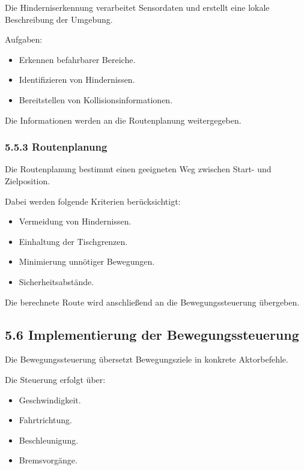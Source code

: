 \documentclass[
  a4paper,
  12pt,
  DIV=12,        %
  parskip=half,  %
  headings=small %
]{scrartcl}
\theoremstyle{definition}
\providecommand{\tightlist}{%
  \setlength{\itemsep}{0pt}\setlength{\parskip}{0pt}}
\theoremstyle{definition}
\providecommand{\tightlist}{%
  \setlength{\itemsep}{0pt}\setlength{\parskip}{0pt}}
\begin{document}
Die Hinderniserkennung verarbeitet Sensordaten und erstellt eine lokale
Beschreibung der Umgebung.

Aufgaben:

\begin{itemize}
\tightlist
\item
  Erkennen befahrbarer Bereiche.
\item
  Identifizieren von Hindernissen.
\item
  Bereitstellen von Kollisionsinformationen.
\end{itemize}

Die Informationen werden an die Routenplanung weitergegeben.

\subsubsection{5.5.3 Routenplanung}\label{routenplanung}

Die Routenplanung bestimmt einen geeigneten Weg zwischen Start- und
Zielposition.

Dabei werden folgende Kriterien berücksichtigt:

\begin{itemize}
\tightlist
\item
  Vermeidung von Hindernissen.
\item
  Einhaltung der Tischgrenzen.
\item
  Minimierung unnötiger Bewegungen.
\item
  Sicherheitsabstände.
\end{itemize}

Die berechnete Route wird anschließend an die Bewegungssteuerung
übergeben.

\subsection{5.6 Implementierung der
Bewegungssteuerung}\label{implementierung-der-bewegungssteuerung}

Die Bewegungssteuerung übersetzt Bewegungsziele in konkrete
Aktorbefehle.

Die Steuerung erfolgt über:

\begin{itemize}
\tightlist
\item
  Geschwindigkeit.
\item
  Fahrtrichtung.
\item
  Beschleunigung.
\item
  Bremsvorgänge.
\end{itemize}
\end{document}
